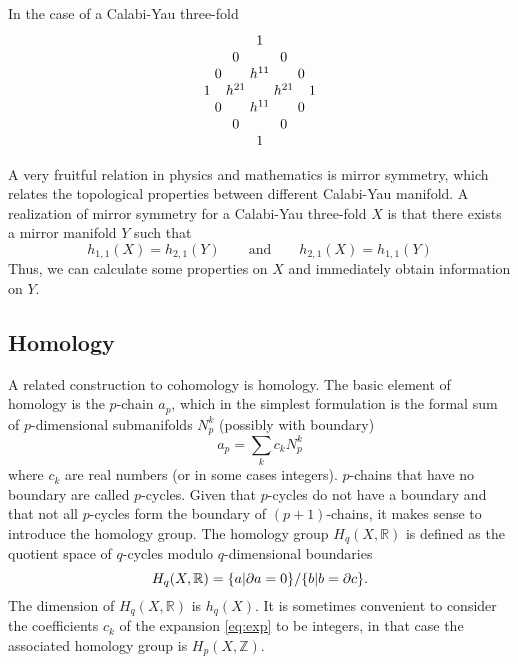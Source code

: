 In the case of a Calabi-Yau three-fold
{\small \[
\arraycolsep=1.5pt
\begin{array}{ccccccc}
  &&&1&&&\\
 &&0&&0&&\\
 &0&&h^{11}&&0&\\
 1&&h^{21}&&h^{21}&&1\\
 &0&&h^{11}&&0&\\
 &&0&&0&&\\
  &&&1&&&
\end{array}
\]}

A very fruitful relation in physics and mathematics is mirror symmetry, which relates the topological
properties between different Calabi-Yau manifold.
A realization of mirror symmetry for a Calabi-Yau three-fold $X$ is that there exists a mirror manifold $Y$
such that
\begin{equation}
  h_{1,1}(X)=h_{2,1}(Y) \qquad \mathrm{and} \qquad h_{2,1}(X)=h_{1,1}(Y)
\end{equation}
Thus, we can calculate some properties on $X$ and immediately obtain information on $Y$.

\subsection{Homology}

A related construction to cohomology is homology.
The basic element of homology is the $p$-chain $a_p$, which in the simplest formulation is the
formal sum of $p$-dimensional submanifolds $N_p^k$ (possibly with boundary)
\begin{equation}
  a_p = \sum_k c_k N_p^k 
  \label{eq:exp}
\end{equation}
where $c_k$ are real numbers (or in some cases integers).
$p$-chains that have no boundary are called $p$-cycles.
Given that $p$-cycles do not have a boundary and that not all $p$-cycles form the boundary of $(p+1)$-chains, it makes sense to introduce the homology group.
The homology group $H_q(X,\mathbb R)$ is defined as the quotient space of $q$-cycles modulo $q$-dimensional
boundaries
\begin{equation}
  H_q(X,\mathbb R) =\qty{a| \partial a=0}/\qty{b|b=\partial c}.
\end{equation}
The dimension of $H_q(X,\mathbb R)$ is $h_q(X)$.
It is sometimes convenient to consider the coefficients $c_k$ of the expansion \eqref{eq:exp} to
be integers, in that case the associated homology group is $H_p(X,\mathbb Z)$.

